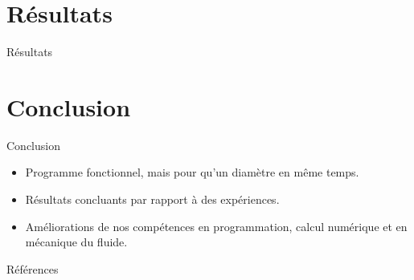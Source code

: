 \documentclass[aspectratio=169,xcolor=dvipsnames]{beamer}
\begin{document}
\section{Résultats}
\begin{frame}{Résultats}
    \begin{center}
    \end{center}
\end{frame}

\section{Conclusion}
\begin{frame}{Conclusion}
    \begin{itemize}
        \item Programme fonctionnel, mais pour qu'un diamètre en même temps.
        \item Résultats concluants par rapport à des expériences.
        \item Améliorations de nos compétences en programmation, calcul numérique et en mécanique du fluide.
    \end{itemize}
\end{frame}

\begin{frame}{Références}
    \nocite{*}
    \printbibliography[title = Références]
\end{frame}
\end{document}

